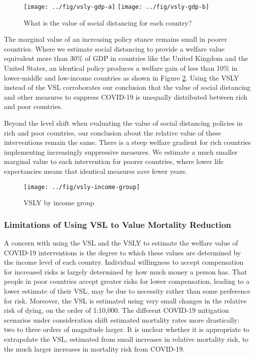 \documentclass[11pt]{article}
\begin{document}
\begin{figure}[htbp!]
  \centering
  \caption{What is the value of social distancing for each country?}
  \texttt{[image: ../fig/vsly-gdp-a]}
  \texttt{[image: ../fig/vsly-gdp-b]}
  \label{fig:vsly-gdp}
\end{figure}

The marginal value of an increasing policy stance remains small in poorer countries. Where we estimate social distancing to provide a welfare value equivalent more than 30\% of GDP in countries like the United Kingdom and the United States, an identical policy produces a welfare gain of less than 10\% in lower-middle and low-income countries as shown in Figure \ref{fig:vsly-income-group}. Using the VSLY instead of the VSL corroborates our conclusion that the value of social distancing and other measures to suppress COVID-19 is unequally distributed between rich and poor countries.




Beyond the level shift when evaluating the value of social distancing policies in rich and poor countries, our conclusion about the relative value of these interventions remain the same. There is a steep welfare gradient for rich countries implementing increasingly suppressive measures. We estimate a much smaller marginal value to each intervention for poorer countries, where lower life expectancies means that identical measures save fewer years.  


\begin{figure}
\centering
\caption{VSLY by income group}
\texttt{[image: ../fig/vsly-income-group]}
\label{fig:vsly-income-group}
\end{figure}

\subsubsection{Limitations of Using VSL to Value Mortality Reduction}

A concern with using the VSL and the VSLY to estimate the welfare value of COVID-19 interventions is the degree to which these values are determined by the income level of each country. Individual willingness to accept compensation for increased risks is largely determined by how much money a person has. That people in poor countries accept greater risks for lower compensation, leading to a lower estimate of their VSL, may be due to necessity rather than some preference for risk. Moreover, the VSL is estimated using very small changes in the relative risk of dying, on the order of 1:10,000. The different COVID-19 mitigation scenarios under consideration shift estimated mortality rates more drastically: two to three orders of magnitude larger. %
It is unclear whether it is appropriate to extrapolate the VSL, estimated from small increases in relative mortality risk, to the much larger increases in mortality risk from COVID-19.
\end{document}
